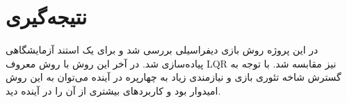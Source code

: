 \section{نتیجه‌گیری}
 در این پروژه روش بازی دیفراسیلی بررسی شد و برای یک استند آزمایشگاهی پیاده‌سازی شد. در آخر این روش با روش معروف LQR نیز مقابسه شد. با توجه به گسترش شاخه تئوری بازی و نیازمندی زیاد به چهارپره در آینده می‌توان به این روش امیدوار بود و کاربرد‌های بیشتری از آن را در آینده دید.